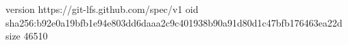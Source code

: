 version https://git-lfs.github.com/spec/v1
oid sha256:b92e0a19bfb1e94e803dd6daaa2c9c401938b90a91d80d1c47bfb176463ea22d
size 46510
